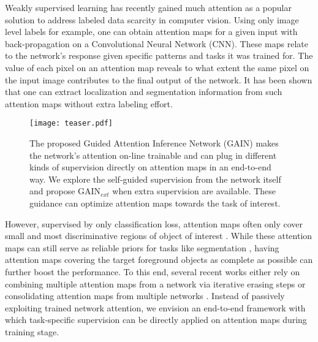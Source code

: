 \documentclass[10pt,twocolumn,letterpaper]{article}
\begin{document}
Weakly supervised learning \cite{simonyan2013deep,zeiler2014visualizing,cao2015look, zhang2016top} has recently gained much attention as a popular solution to address labeled data scarcity in computer vision. Using only image level labels for example, one can obtain attention maps for a given input with back-propagation on a Convolutional Neural Network (CNN). These maps relate to the network's response given specific patterns and tasks it was trained for. The value of each pixel on an attention map reveals to what extent the same pixel on the input image contributes to the final output of the network. It has been shown that one can extract localization and segmentation information from such attention maps without extra labeling effort.




 \begin{figure}%
 \centering
 \texttt{[image: teaser.pdf]} %
 \caption{The proposed Guided Attention Inference Network (GAIN) makes the network's attention on-line trainable and can plug in different kinds of supervision directly on attention maps in an end-to-end way. We explore the self-guided supervision from the network itself and propose GAIN$_{ext}$ when extra supervision are available. These guidance can optimize attention maps towards the task of interest.}
 \label{fig:teaser}
 \end{figure}

However, supervised by only classification loss, attention maps often only cover small and most discriminative regions of object of interest \cite{kim2017two,singh2017hide,zhou2016learning}. While these attention maps can still serve as reliable priors for tasks like segmentation \cite{kolesnikov2016seed}, having attention maps covering the target foreground objects as complete as possible can further boost the performance. To this end, several recent works either rely on  combining multiple attention maps from a network via iterative erasing steps \cite{wei2017object} or consolidating attention maps from multiple networks \cite{kim2017two}. Instead of passively exploiting trained network attention, we envision an end-to-end framework with which task-specific supervision can be directly applied on attention maps during training stage.
\end{document}

